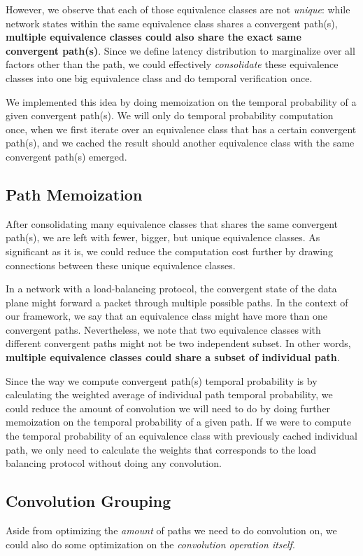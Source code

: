 \documentclass[10pt,sigconf,letterpaper,anonymous,nonacm]{acmart}
\begin{document}
However, we observe that each of those equivalence classes are not \textit{unique}: while network states within 
the same equivalence class shares a convergent path(s), \textbf{multiple equivalence classes could also 
share the exact same convergent path(s)}.
Since we define latency distribution to marginalize over all factors other than the path, we could 
effectively \textit{consolidate} these equivalence classes into one big equivalence class and do temporal 
verification once.

We implemented this idea by doing memoization on the temporal probability of a given convergent path(s).
We will only do temporal probability computation once, when we first iterate over an equivalence class that 
has a certain convergent path(s), and we cached the result should another equivalence class with the same 
convergent path(s) emerged.

\subsection{Path Memoization}
After consolidating many equivalence classes that shares the same convergent path(s), we are left with fewer, 
bigger, but unique equivalence classes.
As significant as it is, we could reduce the computation cost further by drawing connections between these 
unique equivalence classes.

In a network with a load-balancing protocol, the convergent state of the data plane might forward a packet 
through multiple possible paths.
In the context of our framework, we say that an equivalence class might have more than one convergent paths.
Nevertheless, we note that two equivalence classes with different convergent paths might not be two 
independent subset.
In other words, \textbf{multiple equivalence classes could share a subset of individual path}.


Since the way we compute convergent path(s) temporal probability is by calculating the weighted average of 
individual path temporal probability, we could reduce the amount of convolution we will need to do by doing further memoization 
on the temporal probability of a given path.
If we were to compute the temporal probability of an equivalence class with previously cached individual 
path, we only need to calculate the weights that corresponds to the load balancing protocol without 
doing any convolution.

\subsection{Convolution Grouping}
Aside from optimizing the \textit{amount} of paths we need to do convolution on, we could also do some 
optimization on the \textit{convolution operation itself}. 
\end{document}
